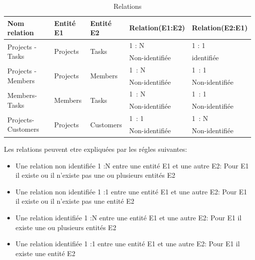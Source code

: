 \begin{table}

\begin{tabular}{|l|l|l|l|l|}
\hline
Nom relation                        & Entité E1                 & Entité E2                  & Relation(E1:E2) & Relation(E2:E1)  \\
\hline
\multirow{2}{*}{Projects -Tasks}    & \multirow{2}{*}{Projects} & \multirow{2}{*}{Tasks}     & 1 : N           & 1 : 1            \\
\cline{4-5}
                                    &                           &                            & Non-identifiée  & identifiée       \\
\hline
\multirow{2}{*}{Projects -Members}  & \multirow{2}{*}{Projects} & \multirow{2}{*}{Members}   & 1~: N           & 1~: 1            \\
\cline{4-5}
                                    &                           &                            & Non-identifiée  & Non-identifiée   \\
\hline
\multirow{2}{*}{Members-Tasks}      & \multirow{2}{*}{Members}  & \multirow{2}{*}{Tasks}     & 1~: N           & 1~: 1            \\
\cline{4-5}
                                    &                           &                            & Non-identifiée  & Non-identifiée   \\
\hline
\multirow{2}{*}{Projects-Customers} & \multirow{2}{*}{Projects} & \multirow{2}{*}{Customers} & 1~: 1           & 1~: N            \\
\cline{4-5}
                                    &                           &                            & Non-identifiée  & Non-identifiée   \\
\hline
\end{tabular}
\centering
\caption {Relations}

\end{table}

\FloatBarrier



Les relations peuvent etre expliqu\'{e}es par les r\'{e}gles suivantes:
\begin{itemize}
\item{ Une relation non identifi\'{e}e 1 :N  entre une entit\'{e} E1 et une autre E2:}
Pour E1 il existe ou il n'existe pas une ou plusieurs entit\'{e}s E2
\bigskip

\item{Une relation non identifi\'{e}e 1 :1 entre une entit\'{e} E1 et une autre E2:}
Pour E1 il existe ou il n'existe pas une entit\'{e} E2
\bigskip

\item{Une relation identifi\'{e}e 1 :N entre une entit\'{e} E1 et une autre E2: }
 Pour E1 il existe une ou plusieurs entit\'{e}s E2
 \bigskip

\item{Une relation identifi\'{e}e 1 :1 entre une entit\'{e} E1 et une autre E2: }
 Pour E1 il existe une entit\'{e} E2
 \bigskip

\end{itemize}

